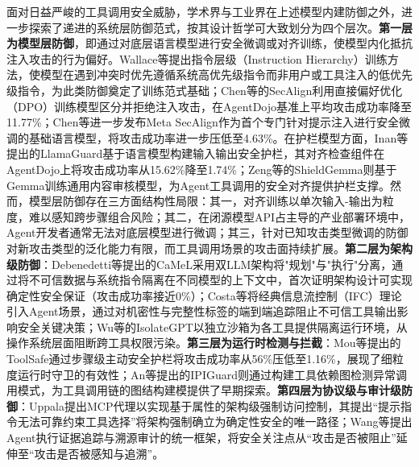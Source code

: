 面对日益严峻的工具调用安全威胁，学术界与工业界在上述模型内建防御之外，进一步探索了递进的系统层防御范式，按其设计哲学可大致划分为四个层次。\textbf{第一层为模型层防御}，即通过对底层语言模型进行安全微调或对齐训练，使模型内化抵抗注入攻击的行为偏好。Wallace等\cite{wallace2024instruction}提出指令层级（Instruction Hierarchy）训练方法，使模型在遇到冲突时优先遵循系统高优先级指令而非用户或工具注入的低优先级指令，为此类防御奠定了训练范式基础；Chen等\cite{chen2025secalign}的SecAlign利用直接偏好优化（DPO）训练模型区分并拒绝注入攻击，在AgentDojo基准上平均攻击成功率降至11.77\%；Chen等\cite{chen2025metasecalign}进一步发布Meta SecAlign作为首个专门针对提示注入进行安全微调的基础语言模型，将攻击成功率进一步压低至4.63\%。在护栏模型方面，Inan等\cite{inan2023llamaguard}提出的LlamaGuard基于语言模型构建输入输出安全护栏，其对齐检查组件在AgentDojo上将攻击成功率从15.62\%降至1.74\%；Zeng等\cite{zeng2024shieldgemma}的ShieldGemma则基于Gemma训练通用内容审核模型，为Agent工具调用的安全对齐提供护栏支撑。然而，模型层防御存在三方面结构性局限：其一，对齐训练以单次输入-输出为粒度，难以感知跨步骤组合风险；其二，在闭源模型API占主导的产业部署环境中，Agent开发者通常无法对底层模型进行微调；其三，针对已知攻击类型微调的防御对新攻击类型的泛化能力有限，而工具调用场景的攻击面持续扩展。\textbf{第二层为架构级防御}：Debenedetti等\cite{debenedetti2025camel}提出的CaMeL采用双LLM架构将"规划"与"执行"分离，通过将不可信数据与系统指令隔离在不同模型的上下文中，首次证明架构设计可实现确定性安全保证（攻击成功率接近0\%）；Costa等\cite{costa2025fides}将经典信息流控制（IFC）理论引入Agent场景，通过对机密性与完整性标签的端到端追踪阻止不可信工具输出影响安全关键决策；Wu等\cite{wu2025isolategpt}的IsolateGPT以独立沙箱为各工具提供隔离运行环境，从操作系统层面阻断跨工具权限污染。\textbf{第三层为运行时检测与拦截}：Mou等\cite{mou2026toolsafe}提出的ToolSafe通过步骤级主动安全护栏将攻击成功率从56\%压低至1.16\%，展现了细粒度运行时守卫的有效性；An等\cite{an2025ipiguard}提出的IPIGuard则通过构建工具依赖图检测异常调用模式，为工具调用链的图结构建模提供了早期探索。\textbf{第四层为协议级与审计级防御}：Uppala\cite{uppala2026prompts}提出MCP代理以实现基于属性的架构级强制访问控制，其提出“提示指令无法可靠约束工具选择”将架构强制确立为确定性安全的唯一路径；Wang等\cite{wang2026fromagenttraces}提出Agent执行证据追踪与溯源审计的统一框架，将安全关注点从“攻击是否被阻止”延伸至“攻击是否被感知与追溯”。

